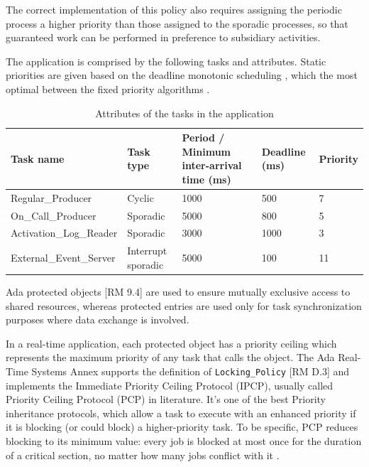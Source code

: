\documentclass{article}
\begin{document}
The correct implementation of this policy also requires assigning the periodic process a higher priority than those assigned to the sporadic processes, so that guaranteed work can be performed in preference to subsidiary activities.

The application is comprised by the following tasks and attributes. Static priorities are given based on the deadline monotonic scheduling \cite{rm-dm}, which the most optimal between the fixed priority algorithms \cite{optimality-rm-dm}.

\begin{table}[!htbp]
   \centering
   \begin{tabular}{lllll}
     \toprule
     Task name & Task type & Period / Minimum inter-arrival time (ms) & Deadline (ms) & Priority  \\
     \midrule
     Regular\_Producer & Cyclic & 1000 & 500 & 7 \\
     On\_Call\_Producer & Sporadic & 5000 & 800 & 5 \\
     Activation\_Log\_Reader & Sporadic & 3000 & 1000 & 3 \\
     External\_Event\_Server & Interrupt sporadic & 5000 & 100 & 11 \\
     \bottomrule
   \end{tabular}
   \caption{Attributes of the tasks in the application \cite{ycs}}
   \label{tab:tasks-attributes}
\end{table}

Ada protected objects [RM 9.4] are used to ensure mutually exclusive access to shared resources, whereas protected entries are used only for task synchronization purposes where data exchange is involved.

In a real-time application, each protected object has a priority ceiling which represents the maximum priority of any task that calls the object. The Ada Real-Time Systems Annex supports the definition of  \texttt{Locking\_Policy} [RM D.3] and implements the Immediate Priority Ceiling Protocol (IPCP), usually called Priority Ceiling Protocol (PCP) in literature. It's one of the best Priority inheritance protocols, which allow a task to execute with an enhanced priority if it is blocking (or could block) a higher-priority task. To be specific, PCP reduces blocking to its minimum value: every job is blocked at most once for the duration of a critical section, no matter how many jobs conflict with it \cite{pcp-blocking}.
\end{document}
